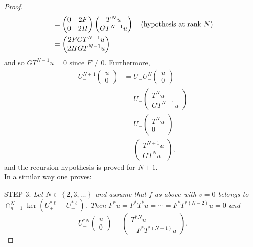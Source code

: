 \documentclass[12pt]{amsart}
\theoremstyle{definition}
\theoremstyle{remark}
\numberwithin{equation}{section}
\begin{document}
\begin{proof}
\[\begin{split}
      &=\begin{pmatrix}0&2F\\0&2H\end{pmatrix}\begin{pmatrix}T^{N}u\\ GT^{N-1}u\end{pmatrix}\quad(\mbox{\rm hypothesis at rank $N$})\\
      &=\begin{pmatrix}2FGT^{N-1}u\\ 2HGT^{N-1}u\end{pmatrix}
          \end{split}
  \]
  and so $GT^{N-1}u=0$ since $F\not=0$. Furthermore,
  \[
    \begin{split}
      U_-^{N+1}\begin{pmatrix}u\\0\end{pmatrix}&=U_-U_-^N\begin{pmatrix}u\\0\end{pmatrix}\\
      &=U_-\begin{pmatrix}T^{N}u\\ GT^{N-1}u\end{pmatrix}\\
      &=U_-\begin{pmatrix}T^{N}u\\ 0\end{pmatrix}\\
      &=\begin{pmatrix}T^{N+1}u\\ GT^{N}u\end{pmatrix},
      \end{split}
    \]
    and the recursion hypothesis is proved for $N+1$.\\

In  a similar way one proves:\smallskip

STEP 3: {\sl Let $N\in\left\{2,3,\ldots\right\}$ and assume that $f$ as above with $v=0$ belongs to $\cap_{n=1}^N\ker(U_+^{*\ell}-U_-^{*\ell})$.
  Then $F^*u=F^*T^*u=\cdots =F^*T^{*(N-2)}u=0$ and
  \begin{equation}
    U_-^{*N}\begin{pmatrix}u\\0\end{pmatrix}=\begin{pmatrix}T^{*N}u\\- F^*T^{*(N-1)}u\end{pmatrix}.
    \end{equation}
  }


\end{proof}
\end{document}
